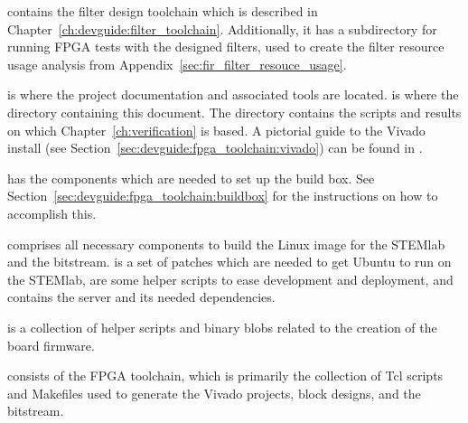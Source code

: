 \begin{minipage}[t]{0.64\textwidth}
    \begin{description}\tightlist
        \vspace*{1ex}
        \item[\code{design/}]       contains      the       filter      design
            toolchain          which     is     described     in
            Chapter~\ref{ch:devguide:filter_toolchain}. Additionally,  it  has
            a  subdirectory   for  running   FPGA  tests  with   the  designed
            filters, used  to create the  filter resource usage  analysis from
            Appendix~\ref{sec:fir_filter_resouce_usage}.

        \item[\code{doc/}] is where the project documentation and associated
            tools      are      located.           is      where
            the     directory      containing     this      document.      The
                 directory     contains    the     scripts
            and    results   on    which   Chapter~\ref{ch:verification}    is
            based. A   pictorial   guide   to    the   Vivado   install   (see
            Section~\ref{sec:devguide:fpga_toolchain:vivado}) can  be found in
            .

        \item[\code{env/}] has the  components which are needed to  set up the
            build  box. See  Section~\ref{sec:devguide:fpga_toolchain:buildbox}
            for the instructions on how to accomplish this.

        \item[\code{firmware/}]  comprises all  necessary components  to build
            the Linux image for the STEMlab and the bitstream. 
            is a  set of  patches which  are needed  to get  Ubuntu to  run on
            the  STEMlab,   are  some  helper  scripts to  ease
            development and deployment, and  contains the server
            and its needed dependencies.

            \textbf{} is a collection  of helper scripts and binary
            blobs related to the creation of the board firmware.

            \textbf{}  consists of  the FPGA  toolchain, which  is
            primarily  the collection  of Tcl  scripts and  Makefiles used  to
            generate the Vivado projects, block designs, and the bitstream.


\end{description}
\end{minipage}
